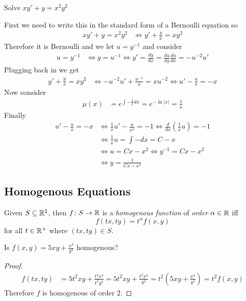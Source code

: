 \documentclass[notes]{subfiles}
\begin{document}
\begin{exercise}
    Solve $xy' + y = x^2y^2$
\end{exercise}
\begin{solution}
    First we need to write this in the standard form of a Bernoulli equation so
    \begin{align*}
        xy' + y = x^2y^2
        &\iff y' + \frac{y}{x} = xy^2
    \end{align*}
    Therefore it is Bernoulli and we let $u = y^{-1}$ and consider 
    \begin{align*}
        u = y^{-1}
        &\iff y = u^{-1}
        \iff y' = \frac{dy}{dx} = \frac{du}{dy}\frac{du}{dx} = -u^{-2}u'
    \end{align*}
    Plugging back in we get
    \begin{align*}
        y' + \frac{y}{x} = xy^2
        &\iff -u^{-2}u' + \frac{u^{-1}}{x} = xu^{-2}
        \iff u' - \frac{u}{x} = -x
    \end{align*}
    Now consider
    \begin{align*}
        \mu(x)
        &= e^{\int -\frac{1}{x} dx}
        = e^{-\ln|x|}
        = \frac{1}{x}
    \end{align*}
    Finally
    \begin{align*}
        u' - \frac{u}{x} = -x
        &\iff \frac{1}{x}u' - \frac{u}{x^2} = -1
        \iff \frac{d}{dx}\left( \frac{1}{x}u \right) = -1 \\
        &\iff \frac{1}{x}u = \int -dx = C - x \\
        &\iff u = Cx - x^2
        \iff y^{-1} = Cx - x^2 \\
        &\iff y = \frac{1}{Cx - x^2}
    \end{align*}
\end{solution}

\subsection{Homogenous Equations}

\begin{definition}
    Given $S \subseteq \mathbb{R}^2$, then $f\colon S \to \mathbb{R}$ is a \textit{homogenous function} of \textit{order} $\alpha \in \mathbb{R}$ iff
    \[
        f(tx, ty) = t^\alpha f(x, y)
    \]
    for all $t \in \mathbb{R}^+$ where $(tx, ty) \in S$.
\end{definition}

\begin{exercise}
    Is $f(x, y) = 5xy + \frac{x^4}{y^2}$ homogenous?
\end{exercise}
\begin{proof}
    \begin{align*}
        f(tx, ty)
        &= 5t^2xy + \frac{t^4x^4}{t^2y^2}
        = 5t^2xy + \frac{t^2x^4}{y^2}
        = t^2\left( 5xy + \frac{x^4}{y^2} \right)
        = t^2 f(x, y)
    \end{align*}
    Therefore $f$ is homogenous of order $2$.
\end{proof}
\end{document}
